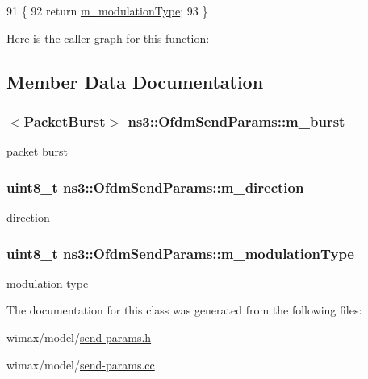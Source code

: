 \begin{DoxyCode}
91   \{
92     \textcolor{keywordflow}{return} \hyperlink{classns3_1_1OfdmSendParams_aa3cd0c31aef1a13f0ccf2cd3246c9eba}{m\_modulationType};
93   \}
\end{DoxyCode}


Here is the caller graph for this function\+:




\subsection{Member Data Documentation}
\subsubsection[{\texorpdfstring{m\+\_\+burst}{m_burst}}]{$<${\bf Packet\+Burst}$>$ ns3\+::\+Ofdm\+Send\+Params\+::m\+\_\+burst\hspace{0.3cm}{\ttfamily [private]}}\hypertarget{classns3_1_1OfdmSendParams_a66182007b25cae2dacce0f0b04abd382}{}\label{classns3_1_1OfdmSendParams_a66182007b25cae2dacce0f0b04abd382}


packet burst 

\subsubsection[{\texorpdfstring{m\+\_\+direction}{m_direction}}]{\setlength{\rightskip}{0pt plus 5cm}uint8\+\_\+t ns3\+::\+Ofdm\+Send\+Params\+::m\+\_\+direction\hspace{0.3cm}{\ttfamily [private]}}\hypertarget{classns3_1_1OfdmSendParams_ab92de8d2a6a65cda5eab7928e8966593}{}\label{classns3_1_1OfdmSendParams_ab92de8d2a6a65cda5eab7928e8966593}


direction 

\subsubsection[{\texorpdfstring{m\+\_\+modulation\+Type}{m_modulationType}}]{\setlength{\rightskip}{0pt plus 5cm}uint8\+\_\+t ns3\+::\+Ofdm\+Send\+Params\+::m\+\_\+modulation\+Type\hspace{0.3cm}{\ttfamily [private]}}\hypertarget{classns3_1_1OfdmSendParams_aa3cd0c31aef1a13f0ccf2cd3246c9eba}{}\label{classns3_1_1OfdmSendParams_aa3cd0c31aef1a13f0ccf2cd3246c9eba}


modulation type 



The documentation for this class was generated from the following files\+:\begin{DoxyCompactItemize}
\item 
wimax/model/\hyperlink{send-params_8h}{send-\/params.\+h}\item 
wimax/model/\hyperlink{send-params_8cc}{send-\/params.\+cc}\end{DoxyCompactItemize}
